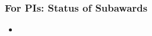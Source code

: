\begin{frame}
\frametitle{For PIs: Status of Subawards}

\begin{itemize}
\item 
\end{itemize}

\end{frame}


